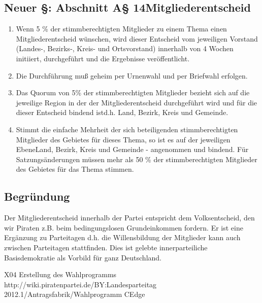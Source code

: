\documentclass[12pt,a4paper,oneside]{scrbook}
\begin{document}
\subsection{Neuer §: Abschnitt A§ 14Mitgliederentscheid}
\begin{enumerate}
	\item Wenn 5 \% der stimmberechtigten Mitglieder zu einem Thema einen Mitgliederentscheid wünschen, wird dieser Entscheid vom jeweiligen Vorstand (Landes-, Bezirks-, Kreis- und Ortsvorstand) innerhalb von 4 Wochen initiiert, durchgeführt und die Ergebnisse veröffentlicht.
	\item Die Durchführung muß geheim per Urnenwahl und per Briefwahl erfolgen.
	\item Das Quorum von 5\% der stimmberechtigten Mitglieder bezieht sich auf die jeweilige Region in der der Mitgliederentscheid durchgeführt wird und für die dieser Entscheid bindend istd.h. Land, Bezirk, Kreis und Gemeinde.
	\item Stimmt die einfache Mehrheit der sich beteiligenden stimmberechtigten Mitglieder des Gebietes
für dieses Thema, so ist es auf der jeweiligen EbeneLand, Bezirk, Kreis und Gemeinde -
angenommen und bindend. Für Satzungsänderungen müssen mehr als 50 \% der stimmberechtigten
Mitglieder des Gebietes für das Thema stimmen.
\end{enumerate}
\subsection{Begründung}
Der Mitgliederentscheid innerhalb der Partei entspricht dem Volksentscheid, den wir Piraten z.B. beim bedingungslosen
Grundeinkommen fordern. Er ist eine Ergänzung zu Parteitagen d.h. die Willensbildung der Mitglieder kann auch zwischen
Parteitagen stattfinden. Dies ist gelebte innerparteiliche Basisdemokratie als Vorbild für ganz Deutschland.

\sonstigerantrag
{X04}
{Erstellung des Wahlprogramms}
{http://wiki.piratenpartei.de/BY:Landesparteitag 2012.1/Antragsfabrik/Wahlprogramm}
{CEdge}
\end{document}
